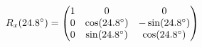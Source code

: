 \documentclass[preview]{standalone}
\begin{document}
\begin{align*}
\special{dvisvgm:raw <g id='unique000'>}R_x(24.8^\circ) = \begin{pmatrix} 1 & 0 & 0 \\ 0 & \cos(24.8^\circ) & -\sin(24.8^\circ) \\ 0 & \sin(24.8^\circ) & \cos(24.8^\circ) \end{pmatrix}\special{dvisvgm:raw </g>}
\end{align*}
\end{document}
